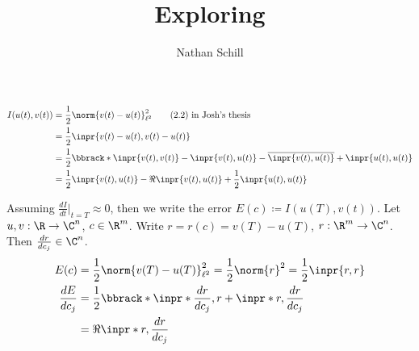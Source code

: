 \documentclass[12pt]{article}
\title{Exploring}
\author{Nathan Schill}
\date{}
\begin{document}
\maketitle

\begin{align*}
  I(u(t), v(t))
  &= \frac12 \norm{v(t) - u(t)}_{\ell^2}^2 \qquad \text{(2.2) in
  Josh's thesis} \\
  &= \frac12 \inpr{v(t) - u(t), v(t) - u(t)} \\
  &= \frac12 \bbrack*{\inpr{v(t), v(t)} - \inpr{v(t), u(t)} -
  \overline{\inpr{v(t), u(t)}} + \inpr{u(t), u(t)}} \\
  &= \frac12 \inpr{v(t), u(t)} - \Re{\inpr{v(t), u(t)}} + \frac12
  \inpr{u(t), u(t)}
\end{align*}

Assuming $\frac {dI} {dt} \Big|_{t=T} \approx 0$, then we write the
error $E(c) \coloneqq I(u(T), v(t))$.
Let $u, v: \R \rightarrow \C^n$, $c \in \R^m$.
Write $r = r(c) = v(T) - u(T)$, $r: \R^m \rightarrow \C^n$.
Then $\frac{dr}{dc_j} \in \C^n$.
\begin{align*}
  E(c)
  &= \frac12 \norm{v(T) - u(T)}_{\ell^2}^2 = \frac12 \norm{r}^2  =
  \frac12 \inpr{r, r} \\
  \frac{dE}{dc_j}
  &= \frac12 \bbrack*{
    \inpr*{\frac{dr}{dc_j}, r} + \inpr*{r, \frac{dr}{dc_j}}
  } \\
  &= \Re \inpr*{r, \frac{dr}{dc_j}}
\end{align*}
\end{document}
